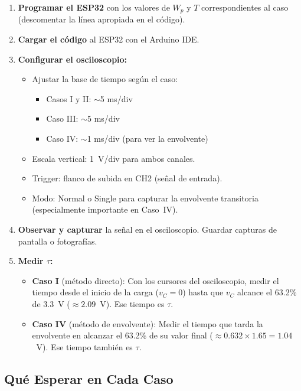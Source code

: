 \documentclass[12pt,a4paper]{article}
\begin{document}
\begin{enumerate}
    \item \textbf{Programar el ESP32} con los valores de $W_p$ y $T$ correspondientes al caso (descomentar la l\'inea apropiada en el c\'odigo).
    \item \textbf{Cargar el c\'odigo} al ESP32 con el Arduino IDE.
    \item \textbf{Configurar el osciloscopio:}
    \begin{itemize}
        \item Ajustar la base de tiempo seg\'un el caso:
        \begin{itemize}
            \item Casos I y II: $\sim$5 ms/div
            \item Caso III: $\sim$5 ms/div
            \item Caso IV: $\sim$1 ms/div (para ver la envolvente)
        \end{itemize}
        \item Escala vertical: 1~V/div para ambos canales.
        \item Trigger: flanco de subida en CH2 (se\~nal de entrada).
        \item Modo: Normal o Single para capturar la envolvente transitoria (especialmente importante en Caso~IV).
    \end{itemize}
    \item \textbf{Observar y capturar} la se\~nal en el osciloscopio. Guardar capturas de pantalla o fotograf\'ias.
    \item \textbf{Medir $\tau$:}
    \begin{itemize}
        \item \textbf{Caso I} (m\'etodo directo): Con los cursores del osciloscopio, medir el tiempo desde el inicio de la carga ($v_C = 0$) hasta que $v_C$ alcance el 63.2\% de 3.3~V ($\approx 2.09$~V). Ese tiempo es $\tau$.
        \item \textbf{Caso IV} (m\'etodo de envolvente): Medir el tiempo que tarda la envolvente en alcanzar el 63.2\% de su valor final ($\approx 0.632 \times 1.65 = 1.04$~V). Ese tiempo tambi\'en es $\tau$.
    \end{itemize}
\end{enumerate}

\subsection{Qu\'e Esperar en Cada Caso}
\end{document}
